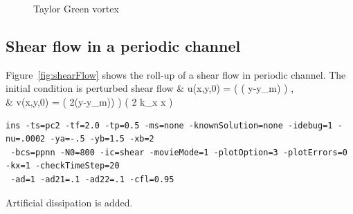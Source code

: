 {
\newcommand{\figSizeWide}{16cm}
\newcommand{\figSize}{9cm}
\newcommand{\figHeight}{4.5cm}

\begin{figure}[htb]
\begin{center}
\end{center}
\caption{Taylor Green vortex
    } 
\label{fig:TaylorGreenVortex}
\end{figure}
}



\clearpage
\subsection{Shear flow in a periodic channel}

Figure~\ref{fig:shearFlow} shows the roll-up of a shear flow in periodic channel.
The initial condition is perturbed shear flow
\ba
  & u(x,y,0) = \tanh( \beta ( y-y_m) ) , \\
  & v(x,y,0) = \delta\cos( 2\pi (y-y_m)) ) \sin( 2 \pi k_x x ) 
\ea
\begin{Verbatim}[fontsize=\small]
ins -ts=pc2 -tf=2.0 -tp=0.5 -ms=none -knownSolution=none -idebug=1 -nu=.0002 -ya=-.5 -yb=1.5 -xb=2
 -bcs=ppnn -N0=800 -ic=shear -movieMode=1 -plotOption=3 -plotErrors=0 -kx=1 -checkTimeStep=20 
 -ad=1 -ad21=.1 -ad22=.1 -cfl=0.95
\end{Verbatim}
Artificial dissipation is added.


